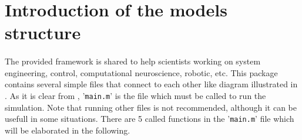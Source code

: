 \section{Introduction of the models structure} {
	\paragraph{} {
		The provided framework is shared to help scientists working on system engineering, control, computational neuroscience, robotic, etc.
		This package contains several simple files that connect to each other like diagram illustrated in . As it is clear from , '\texttt{main.m}' is the file which must be called to run the simulation.
		Note that running other files is not recommended, although it can be usefull in some situations. 
		There are 5 called functions in the '\texttt{main.m}' file which will be elaborated in the following.
	}
	\begin{figure}[b!]
	\end{figure}
}

